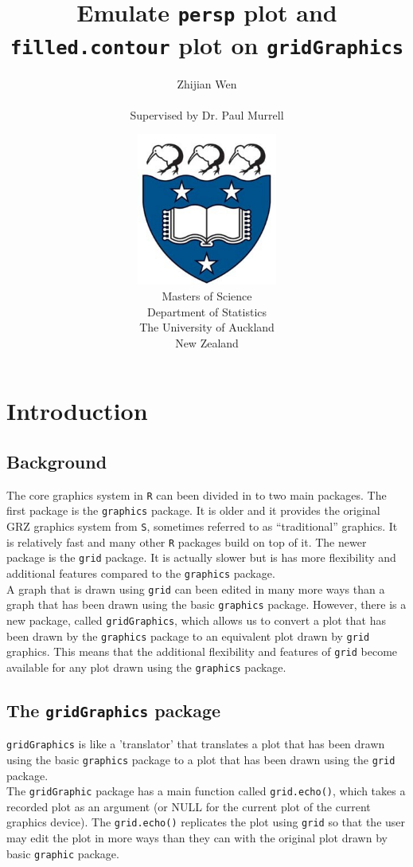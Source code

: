 \documentclass[paper=a4, fontsize=11pt]{report}
\title{\Huge{Emulate \texttt{persp} plot and \texttt{filled.contour} plot on \texttt{gridGraphics}}}
\author{\Large{Zhijian Wen} \\ \\ \Large{Supervised by Dr. Paul Murrell}}
\date
{
\vspace{3cm}
\includegraphics[height = 5cm, width = 5cm]{logo.jpg}\\
\vspace{1cm}
Masters of Science\\
Department of Statistics\\
The University of Auckland\\
New Zealand
}
\begin{document}

\setlength{\parindent}{0}
\noindent

\maketitle
\tableofcontents
\listoffigures
\chapter{Introduction}
\section{Background}
The core graphics system in \texttt{R} can been divided in to two main packages. The first package is the \texttt{graphics} package. It is older and it provides the original GRZ graphics system from \texttt{S}, sometimes referred to as ``traditional'' graphics. It is relatively fast and many other \texttt{R} packages build on top of it. The newer package is the \texttt{grid} package. It is actually slower but is has more flexibility and additional features compared to the \texttt{graphics} package. \\

A graph that is drawn using \texttt{grid} can been edited in many more ways than a graph that has been drawn using the basic \texttt{graphics} package. However, there is a new package, called \texttt{gridGraphics}, which allows us to convert a plot that has been drawn by the \texttt{graphics} package to an equivalent plot drawn by \texttt{grid} graphics. This means that the additional flexibility and features of \texttt{grid} become available for any plot drawn using the \texttt{graphics} package. \\

\section{The \texttt{gridGraphics} package}
\texttt{gridGraphics} is like a 'translator' that translates a plot that has been drawn using the basic \texttt{graphics} package to a plot that has been drawn using the \texttt{grid} package. \\

The \texttt{gridGraphic} package has a main function called \texttt{grid.echo()}, which takes a recorded plot as an argument (or NULL for the current plot of the current graphics device). The \texttt{grid.echo()} replicates the plot using \texttt{grid} so that the user may edit the plot in more ways than they can with the original plot drawn by basic \texttt{graphic} package.\\
\end{document}
